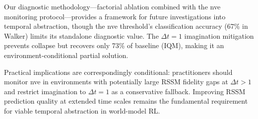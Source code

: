 \documentclass[10pt,letterpaper]{article}
\begin{document}
Our diagnostic methodology---factorial ablation combined with the nve monitoring protocol---provides a framework for future investigations into temporal abstraction, though the nve threshold's classification accuracy (67\% in Walker) limits its standalone diagnostic value. The $\Delta t{=}1$ imagination mitigation prevents collapse but recovers only 73\% of baseline (IQM), making it an environment-conditional partial solution.

Practical implications are correspondingly conditional: practitioners should monitor nve in environments with potentially large RSSM fidelity gaps at $\Delta t{>}1$ and restrict imagination to $\Delta t{=}1$ as a conservative fallback. Improving RSSM prediction quality at extended time scales remains the fundamental requirement for viable temporal abstraction in world-model RL.
\end{document}
